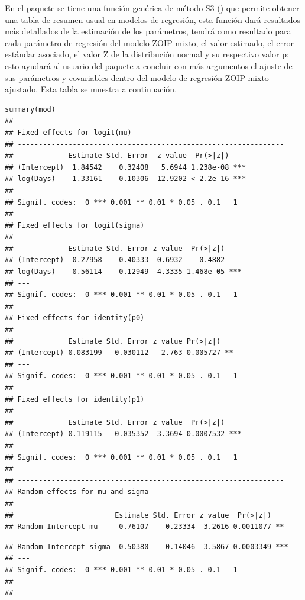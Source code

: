 En el paquete  se tiene una funci\'{o}n gen\'{e}rica de m\'{e}todo S3 () que permite obtener una tabla de resumen usual en modelos de regresi\'{o}n, esta funci\'{o}n dar\'{a} resultados m\'{a}s detallados de la estimaci\'{o}n de los par\'{a}metros, tendr\'{a} como resultado para cada par\'{a}metro de regresi\'{o}n del modelo ZOIP mixto, el valor estimado, el error est\'{a}ndar asociado, el valor Z de la distribuci\'{o}n normal y su respectivo valor p; esto ayudar\'{a} al usuario del paquete  a concluir con m\'{a}s argumentos el ajuste de sus par\'{a}metros y covariables dentro del modelo de regresi\'{o}n ZOIP mixto ajustado. Esta tabla se muestra a continuaci\'{o}n.

\begin{verbatim}
summary(mod)
## ---------------------------------------------------------------
## Fixed effects for logit(mu) 
## ---------------------------------------------------------------
##             Estimate Std. Error  z value  Pr(>|z|)    
## (Intercept)  1.84542    0.32408   5.6944 1.238e-08 ***
## log(Days)   -1.33161    0.10306 -12.9202 < 2.2e-16 ***
## ---
## Signif. codes:  0 *** 0.001 ** 0.01 * 0.05 . 0.1   1
## ---------------------------------------------------------------
## Fixed effects for logit(sigma) 
## ---------------------------------------------------------------
##             Estimate Std. Error z value  Pr(>|z|)    
## (Intercept)  0.27958    0.40333  0.6932    0.4882    
## log(Days)   -0.56114    0.12949 -4.3335 1.468e-05 ***
## ---
## Signif. codes:  0 *** 0.001 ** 0.01 * 0.05 . 0.1   1
## ---------------------------------------------------------------
## Fixed effects for identity(p0) 
## ---------------------------------------------------------------
##             Estimate Std. Error z value Pr(>|z|)   
## (Intercept) 0.083199   0.030112   2.763 0.005727 **
## ---
## Signif. codes:  0 *** 0.001 ** 0.01 * 0.05 . 0.1   1
## ---------------------------------------------------------------
## Fixed effects for identity(p1) 
## ---------------------------------------------------------------
##             Estimate Std. Error z value  Pr(>|z|)    
## (Intercept) 0.119115   0.035352  3.3694 0.0007532 ***
## ---
## Signif. codes:  0 *** 0.001 ** 0.01 * 0.05 . 0.1   1
## ---------------------------------------------------------------
## ---------------------------------------------------------------
## Random effects for mu and sigma 
## ---------------------------------------------------------------
##                        Estimate Std. Error z value  Pr(>|z|)    
## Random Intercept mu     0.76107    0.23334  3.2616 0.0011077 ** 
\end{verbatim}
\begin{verbatim}
## Random Intercept sigma  0.50380    0.14046  3.5867 0.0003349 ***
## ---
## Signif. codes:  0 *** 0.001 ** 0.01 * 0.05 . 0.1   1
## ---------------------------------------------------------------
## ---------------------------------------------------------------
\end{verbatim}


